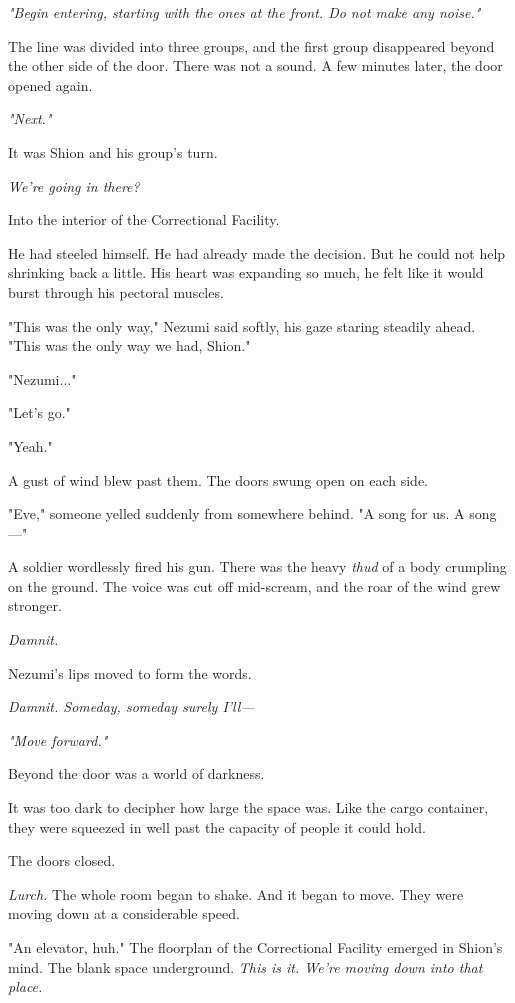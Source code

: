\emph{"Begin entering, starting with the ones at the front. Do not make
any noise."}

The line was divided into three groups, and the first group disappeared
beyond the other side of the door. There was not a sound. A few minutes
later, the door opened again.

\emph{"Next."}

It was Shion and his group's turn.

\emph{We're going in there?}

Into the interior of the Correctional Facility.

He had steeled himself. He had already made the decision. But he could
not help shrinking back a little. His heart was expanding so much, he
felt like it would burst through his pectoral muscles.

"This was the only way," Nezumi said softly, his gaze staring steadily
ahead. "This was the only way we had, Shion."

"Nezumi..."

"Let's go."

"Yeah."

A gust of wind blew past them. The doors swung open on each side.

"Eve," someone yelled suddenly from somewhere behind. "A song for us. A
song---"

A soldier wordlessly fired his gun. There was the heavy \emph{thud} of a body
crumpling on the ground. The voice was cut off mid-scream, and the roar
of the wind grew stronger.

\emph{Damnit.}

Nezumi's lips moved to form the words.

\emph{Damnit. Someday, someday surely I'll---}

\emph{"Move forward."}

Beyond the door was a world of darkness.

It was too dark to decipher how large the space was. Like the cargo
container, they were squeezed in well past the capacity of people it
could hold.

The doors closed.

\emph{Lurch.} The whole room began to shake. And it began to move. They
were moving down at a considerable speed.

"An elevator, huh." The floorplan of the Correctional Facility emerged
in Shion's mind. The blank space underground. \emph{This is it. We're
moving down into that place.}

